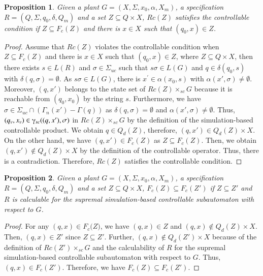 \documentclass[12pt,draftcls,onecolumn]{IEEEtran}
\newtheorem{Proposition}{Proposition}
\begin{document}
\begin{Proposition} \label{cs}
Given a plant $G =(X,\Sigma,x_{0},\alpha,X_{m})$, a specification $R
=(Q,\Sigma,q_{0},\delta,Q_{m})$  and a set $Z \subseteq Q \times X$,
$Rc(Z)$ satisfies the controllable condition if $Z \subseteq F_c(Z)$
and there is $x\in X$ such that $(q_0, x) \in Z$.
\end{Proposition}


\begin{proof}
Assume that $Rc(Z)$ violates the controllable condition when $Z
\subseteq F_c(Z)$ and there is $x \in X$ such that $(q_0, x) \in Z$,
where $Z \subseteq Q \times X$, then there exists $s \in L(R)$ and
$\sigma \in \Sigma_{uc}$ such that $s\sigma \in L(G)$ and $q \in
\delta(q_0, s)$ with $\delta(q, \sigma) = \emptyset$. As $s\sigma
\in L(G)$, there is $x^{'}\in \alpha (x_0, s)$ with $\alpha(x',
\sigma) \neq \emptyset$. Moreover, $(q, x')$ belongs to the state
set of $Rc(Z) \times_{sc} G$ because it is reachable from $(q_0,
x_0)$ by the string $s$. Furthermore, we have $\sigma \in
\Sigma_{uc} \cap (\Gamma_n(x')-\Gamma(q))$ as $\delta(q, \sigma) =
\emptyset$ and $\alpha(x', \sigma) \neq \emptyset$. Thus, $(q_v,
x_v) \in \gammaup_{sc}((q, x'), \sigma)$ in $Rc(Z) \times_{sc} G$ by
the definition of the simulation-based controllable product. We
obtain $q \in Q_d(Z)$, therefore, $(q, x') \in Q_d(Z) \times X$. On
the other hand, we have $(q, x') \in F_c(Z)$ as $Z \subseteq
F_c(Z)$. Then, we obtain $(q, x')\notin Q_d(Z) \times X$ by the
definition of the controllable operator. Thus, there is a
contradiction. Therefore, $Rc(Z)$ satisfies the controllable
condition.
\end{proof}


\begin{Proposition}\label{cm}
Given a plant $G =(X,\Sigma,x_{0},\alpha,X_{m})$, a specification $R
=(Q,\Sigma,q_{0},\delta,Q_{m})$ and a set $Z \subseteq Q \times X$,
$F_c(Z) \subseteq F_c(Z')$ if $Z \subseteq Z'$ and $R$ is calculable
for the supremal simulation-based controllable subautomaton with
respect to $G$.
\end{Proposition}

\begin{proof}
For any $(q, x) \in F_c{(Z})$, we have $(q, x) \in Z$ and $(q, x)
\notin Q_d(Z) \times X$. Then, $(q, x)\in Z'$ since $Z \subseteq
Z'$. Further, $(q, x) \notin Q_d(Z') \times X$ because of the
definition of $Rc(Z') \times_{sc} G$ and the calculability of $R$
for the supremal simulation-based controllable subautomaton with
respect to $G$. Thus, $(q, x) \in F_c(Z')$. Therefore, we have
$F_c(Z) \subseteq F_c(Z')$.
\end{proof}
\end{document}
